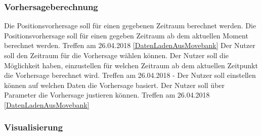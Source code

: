 \documentclass[12pt]{article} %
\begin{document}
\subsubsection{Vorhersageberechnung}

\begin{requirements}[ref={(R\arabic*)},label=(R\arabic*),resume]
{
 Die Positionsvorhersage soll für einen gegebenen Zeitraum berechnet werden. 
 }{
 Die Positionsvorhersage soll für einen gegeben Zeitraum ab dem aktuellen Moment berechnet werden. 
 }{
 Treffen am 26.04.2018 
 }{
 \ref{DatenLadenAusMovebank} 
}
{
 Der Nutzer soll den Zeitraum für die Vorhersage wählen können.
 }{
 Der Nutzer soll die Möglichkeit haben, einzustellen für welchen Zeitraum ab dem aktuellen Zeitpunkt die Vorhersage berechnet wird. 
 }{
 Treffen am 26.04.2018
 }{
 - 
}
{
 Der Nutzer soll einstellen können auf welchen Daten die Vorhersage basiert.
 }{
 Der Nutzer soll über Parameter die Vorhersage justieren können. 
 }{
 Treffen am 26.04.2018
 }{
 \ref{DatenLadenAusMovebank} 
}
\end{requirements}

\subsubsection{Visualisierung}
\end{document}
